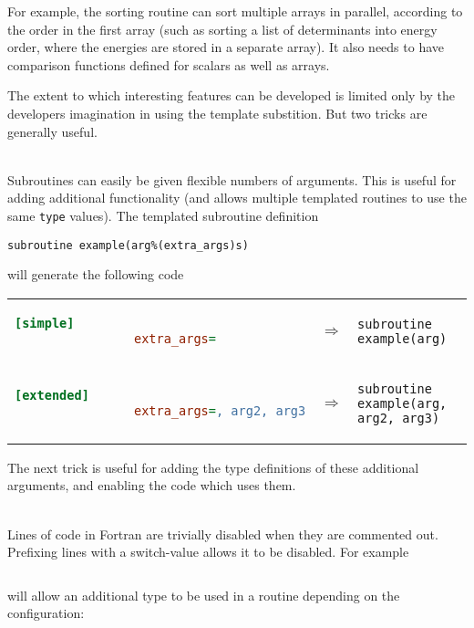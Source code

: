 \documentclass[a4paper,notitlepage]{scrreprt}
\newcommand\headitem[1]{\needspace{1.5\baselineskip}\item[{\boldmath #1 \nopagebreak}] \hfill \\ \nopagebreak}
\let\code\lstinline
\begin{document}
{{	For example, the sorting routine can sort multiple arrays in parallel,
	according to the order in the first array (such as sorting a list of
	determinants into energy order, where the energies are stored in a separate
	array). It also needs to have comparison functions defined for scalars as
	well as arrays.

	The extent to which interesting features can be developed is limited only
	by the developers imagination in using the template substition. But two
	tricks are generally useful.

		\begin{description}
		\headitem{Additional optional arguments}
			Subroutines can easily be given flexible numbers of arguments. This
			is useful for adding additional functionality (and allows multiple
			templated routines to use the same \code{type} values). The
			templated subroutine definition
			\begin{lstlisting}[gobble=12]
				subroutine example(arg%(extra_args)s)
			\end{lstlisting}
			will generate the following code

			\begin{minipage}{\textwidth}
			\begin{tabular}{lcl}
			\begin{lstlisting}[language=ini,gobble=16]
				[simple]
				extra_args=
			\end{lstlisting}
			& $\Longrightarrow$ &
			\begin{lstlisting}[gobble=16]
				subroutine example(arg)
			\end{lstlisting} \\[1.5em]

			\begin{lstlisting}[language=ini,gobble=16]
				[extended]
				extra_args=, arg2, arg3
			\end{lstlisting}

			& $\Longrightarrow$ &
			\begin{lstlisting}[gobble=16]
				subroutine example(arg, arg2, arg3)
			\end{lstlisting}
			\end{tabular}
			\end{minipage}

			The next trick is useful for adding the type definitions of these
			additional arguments, and enabling the code which uses them.

		\headitem{Switching off lines of code}
			Lines of code in Fortran are trivially disabled when they are
			commented out. Prefixing lines with a switch-value allows it to be
			disabled. For example
			\begin{lstlisting}[gobble=12]
				%(use_type2)%(type2) :: val()
			\end{lstlisting}
			will allow an additional type to be used in a routine depending on
			the configuration:


\end{description}}}
\end{document}
